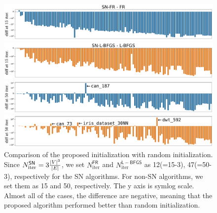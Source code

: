\documentclass[dvipdfmx,journal]{IEEEtran}
\begin{document}
\begin{figure}[t]
    \centering
    \begin{minipage}{\columnwidth}
        \centering
        \includegraphics[width=\columnwidth]{overall/plot/diff_FR_15.pdf}
    \end{minipage}
    \begin{minipage}{\columnwidth}
        \centering
        \includegraphics[width=\columnwidth]{overall/plot/diff_L-BFGS_15.pdf}
    \end{minipage}
    \begin{minipage}{\columnwidth}
        \centering
        \includegraphics[width=\columnwidth]{overall/plot/diff_FR_50.pdf}
    \end{minipage}
    \begin{minipage}{\columnwidth}
        \centering
        \includegraphics[width=\columnwidth]{overall/plot/diff_L-BFGS_50.pdf}
    \end{minipage}
    \caption{
        Comparison of the proposed initialization with random initialization.
        Since $N_\mathrm{iter}^\mathsf{SN} = 3 \frac{\abs{V}^3}{\abs{E}}$, we set $N_\mathrm{iter}^\mathsf{FR}$ and $N_\mathrm{iter}^\mathsf{L-BFGS}$ as 12(=15-3), 47(=50-3), respectively for the \textsf{SN} algorithms. For non-\textsf{SN} algorithms, we set them as 15 and 50, respectively.
        The y axis is symlog scale.
        Almost all of the cases,
        the difference are negative, meaning that the proposed algorithm performed better than random initialization.
    }
    \label{fig:diff_L_BFGS}
\end{figure}
\end{document}

